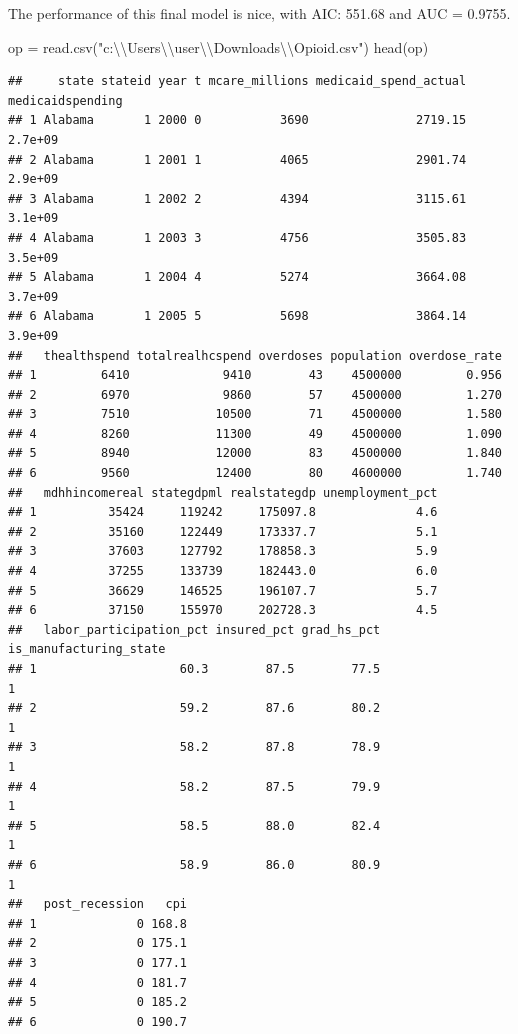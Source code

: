 \documentclass[
]{article}
\newenvironment{Shaded}{\begin{snugshade}}{\end{snugshade}}
\newcommand{\FunctionTok}[1]{\textcolor[rgb]{0.00,0.00,0.00}{#1}}
\newcommand{\NormalTok}[1]{#1}
\newcommand{\OtherTok}[1]{\textcolor[rgb]{0.56,0.35,0.01}{#1}}
\newcommand{\SpecialCharTok}[1]{\textcolor[rgb]{0.00,0.00,0.00}{#1}}
\newcommand{\StringTok}[1]{\textcolor[rgb]{0.31,0.60,0.02}{#1}}
\begin{document}
The performance of this final model is nice, with AIC: 551.68 and AUC =
0.9755.

\begin{Shaded}
\begin{Highlighting}[]
\NormalTok{op }\OtherTok{=} \FunctionTok{read.csv}\NormalTok{(}\StringTok{"c:}\SpecialCharTok{\textbackslash{}\textbackslash{}}\StringTok{Users}\SpecialCharTok{\textbackslash{}\textbackslash{}}\StringTok{user}\SpecialCharTok{\textbackslash{}\textbackslash{}}\StringTok{Downloads}\SpecialCharTok{\textbackslash{}\textbackslash{}}\StringTok{Opioid.csv"}\NormalTok{)}
\FunctionTok{head}\NormalTok{(op)}
\end{Highlighting}
\end{Shaded}

\begin{verbatim}
##     state stateid year t mcare_millions medicaid_spend_actual medicaidspending
## 1 Alabama       1 2000 0           3690               2719.15          2.7e+09
## 2 Alabama       1 2001 1           4065               2901.74          2.9e+09
## 3 Alabama       1 2002 2           4394               3115.61          3.1e+09
## 4 Alabama       1 2003 3           4756               3505.83          3.5e+09
## 5 Alabama       1 2004 4           5274               3664.08          3.7e+09
## 6 Alabama       1 2005 5           5698               3864.14          3.9e+09
##   thealthspend totalrealhcspend overdoses population overdose_rate
## 1         6410             9410        43    4500000         0.956
## 2         6970             9860        57    4500000         1.270
## 3         7510            10500        71    4500000         1.580
## 4         8260            11300        49    4500000         1.090
## 5         8940            12000        83    4500000         1.840
## 6         9560            12400        80    4600000         1.740
##   mdhhincomereal stategdpml realstategdp unemployment_pct
## 1          35424     119242     175097.8              4.6
## 2          35160     122449     173337.7              5.1
## 3          37603     127792     178858.3              5.9
## 4          37255     133739     182443.0              6.0
## 5          36629     146525     196107.7              5.7
## 6          37150     155970     202728.3              4.5
##   labor_participation_pct insured_pct grad_hs_pct is_manufacturing_state
## 1                    60.3        87.5        77.5                      1
## 2                    59.2        87.6        80.2                      1
## 3                    58.2        87.8        78.9                      1
## 4                    58.2        87.5        79.9                      1
## 5                    58.5        88.0        82.4                      1
## 6                    58.9        86.0        80.9                      1
##   post_recession   cpi
## 1              0 168.8
## 2              0 175.1
## 3              0 177.1
## 4              0 181.7
## 5              0 185.2
## 6              0 190.7
\end{verbatim}
\end{document}
